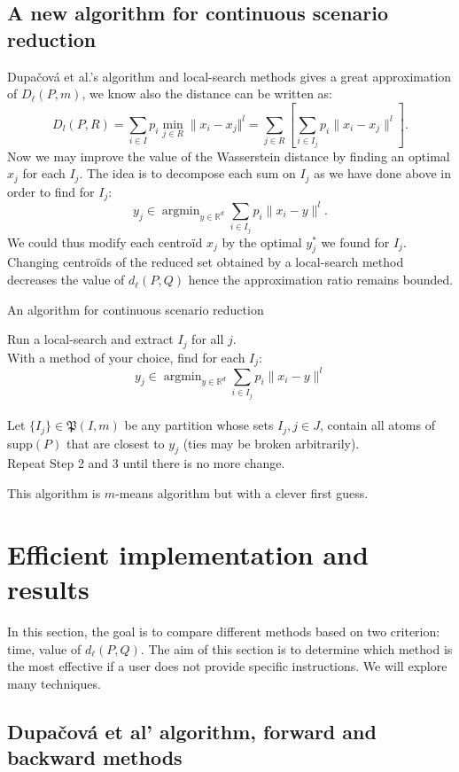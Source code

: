\documentclass{amsart}
\newcommand{\argmin}{\mathop{\arg\min}}
\newcommand{\RR}{\mathbb{R}}
\begin{document}
\subsection{A new algorithm for continuous scenario reduction}
Dupačová et al.'s algorithm and local-search methods gives a great approximation of $D_\ell\left(P,m\right)$, we know also the distance can be written as:
$$D_l\left(P,R\right)=\sum_{i\in I}p_i\min_{j\in R}\lVert x_i-x_j\Vert^l=\sum_{j\in R}\left[\sum_{i\in I_j}p_i\lVert x_i-x_j\rVert^l\right].$$
Now we may improve the value of the Wasserstein distance by finding an optimal $x_j$ for each $I_j$. The idea is to decompose each sum on $I_j$ as we have done above in order to find for $I_j$: 
$$
y_j\in \argmin_{y\in\RR^d}\sum_{i\in I_j}p_i\lVert x_i-y\rVert^l.
$$
We could thus modify each centroïd $x_j$ by the optimal $y^*_j$ we found for $I_j$. Changing centroïds of the reduced set obtained by a local-search method decreases the value of $d_\ell\left(P,Q\right)$ hence the approximation ratio remains bounded. 

\begin{algorithm}[h]\caption{An algorithm for continuous scenario reduction}
    \label{improved ls}
    Run a local-search and extract $I_j$ for all $j$. \\
    With a method of your choice, find for each $I_j$: $$y_j\in\argmin_{y\in\RR^d}\sum_{i\in I_j}p_i\lVert x_i-y\rVert^l$$
    \\ Let $\{I_j\}\in\mathfrak{P}\left(I,m\right)$ be any partition whose sets $I_j, j\in J$, contain all atoms of supp$\left(P\right)$ that are closest to $y_j$ (ties may be broken arbitrarily). \\
    Repeat Step 2 and 3 until there is no more change.
\end{algorithm}

This algorithm is $m$-means algorithm but with a clever first guess.

\section{Efficient implementation and results}\label{fast}
In this section, the goal is to compare different methods based on two criterion: time, value of $d_\ell\left(P,Q\right)$. The aim of this section is to determine which method is the most effective if a user does not provide specific instructions. We will explore many techniques. 
\subsection{Dupačová et al' algorithm, forward and backward methods}
\end{document}
